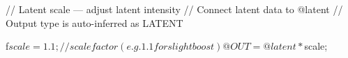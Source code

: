 // Latent scale — adjust latent intensity
// Connect latent data to @latent
// Output type is auto-inferred as LATENT

f$scale = 1.1;   // scale factor (e.g. 1.1 for slight boost)

@OUT = @latent * $scale;
